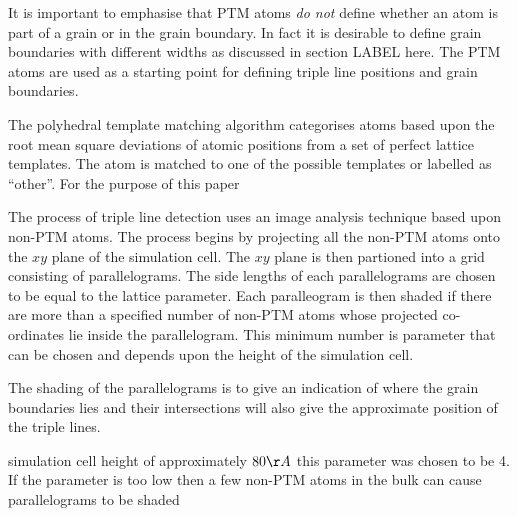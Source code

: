 \documentclass[12pt,a4paper]{book}
\begin{document}
It is important to emphasise that PTM atoms \emph{do not} define whether an atom is part of a grain or in the grain boundary. In fact it is desirable to define grain boundaries with different widths as discussed in section LABEL here. The PTM atoms are used as a starting point for defining triple line positions and grain boundaries.

The polyhedral template matching algorithm categorises atoms based upon the root mean square deviations of atomic positions from a set of perfect lattice templates. The atom is matched to one of the possible templates or labelled as ``other''. For the purpose of this paper  

The process of triple line detection uses an image analysis technique based upon non-PTM atoms. The process begins by projecting all the non-PTM atoms onto the $xy$ plane of the simulation cell. The $xy$ plane is then partioned into a grid consisting of parallelograms. The side lengths of each parallelograms are chosen to be equal to the lattice parameter. Each paralleogram is then shaded if there are more than a specified number of non-PTM atoms whose projected co-ordinates lie inside the parallelogram. This minimum number is parameter that can be chosen and depends upon the height of the simulation cell.

The shading of the parallelograms is to give an indication of where the grain boundaries lies and their intersections will also give the approximate position of the triple lines.

 simulation cell height of approximately $80 \AA$ this parameter was chosen to be 4. If the parameter is too low then a few non-PTM atoms in the bulk can cause parallelograms to be shaded   
\end{document}
